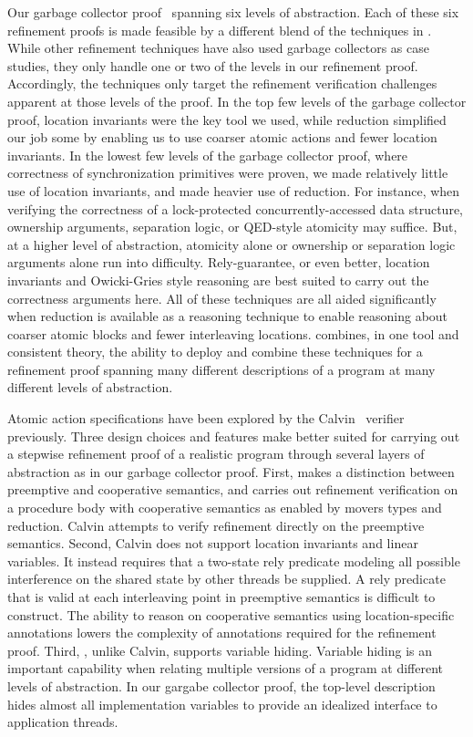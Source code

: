 Our garbage collector
proof~\cite{techreport} spanning six levels of abstraction.
Each of these six refinement proofs is made feasible by a different
blend of the techniques in \civl. 
While other refinement techniques have also used garbage collectors as
case studies, they only handle one or two of the levels in 
our refinement proof. 
Accordingly, the techniques only target the refinement verification
challenges apparent at those levels of the proof. 
In the top few levels of the garbage collector proof, location
invariants were the key tool we used, while reduction simplified our
job some by enabling us to use coarser atomic actions and fewer
location invariants.  
In the lowest few levels of the garbage collector proof, where
correctness of synchronization primitives were proven, we made
relatively little use of location invariants, and made heavier use of
reduction.
For instance, when verifying the correctness of a
lock-protected concurrently-accessed data structure, ownership
arguments, separation logic, or QED-style atomicity may suffice. 
But,
at a higher level of abstraction, atomicity alone or ownership or
separation logic arguments alone run into difficulty. 
Rely-guarantee,
or even better, location invariants and Owicki-Gries style reasoning
are best suited to carry out the correctness arguments here. 
All of these
techniques are all aided significantly when reduction is available as
a reasoning technique to enable reasoning about coarser atomic blocks
and fewer interleaving locations. 
\civl combines, in one tool and consistent theory, the ability to
deploy and combine these techniques for a refinement proof spanning
many different descriptions of a program at many different levels of
abstraction. 

Atomic action specifications have been explored by the
Calvin~\cite{FlanaganFQS05} verifier previously. 
Three design choices and features make \civl better suited for
carrying out a stepwise refinement proof of a realistic program
through several layers of abstraction as in our garbage collector
proof. 
First, \civl makes a distinction between preemptive and cooperative
semantics, and carries out refinement verification on a procedure body
with cooperative semantics as enabled by movers types and reduction. 
Calvin attempts to verify refinement directly on the preemptive semantics.
Second, Calvin does not support location invariants and linear variables. 
It instead requires that a two-state rely predicate modeling all possible
interference on the shared state by other threads be supplied. 
A rely predicate that is valid at each interleaving point in
preemptive semantics is difficult to construct. 
The ability to reason on cooperative semantics using location-specific
annotations lowers the complexity of annotations required for the refinement proof.
Third, \civl, unlike Calvin, supports variable hiding. Variable hiding
is an important capability when relating multiple versions of a
program at different levels of abstraction. In our gargabe collector
proof, the top-level description hides almost all implementation
variables to provide an idealized interface to application threads. 

